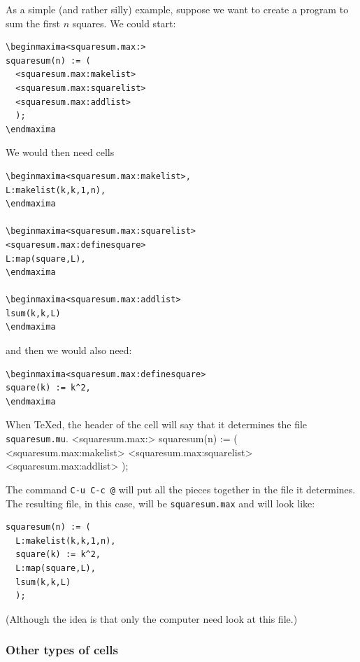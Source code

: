 As a simple (and rather silly) example, suppose we want to create a
program to sum the first $n$ squares.  We could start:
\begin{verbatim}
\beginmaxima<squaresum.max:>
squaresum(n) := (
  <squaresum.max:makelist>
  <squaresum.max:squarelist>
  <squaresum.max:addlist>
  );        
\endmaxima
\end{verbatim}
\noindent
We would then need cells
\begin{verbatim}
\beginmaxima<squaresum.max:makelist>,
L:makelist(k,k,1,n),
\endmaxima

\beginmaxima<squaresum.max:squarelist>
<squaresum.max:definesquare>
L:map(square,L),
\endmaxima

\beginmaxima<squaresum.max:addlist>
lsum(k,k,L)
\endmaxima
\end{verbatim}
\noindent
and then we would also need:
\begin{verbatim}
\beginmaxima<squaresum.max:definesquare>
square(k) := k^2,
\endmaxima
\end{verbatim}
\noindent
When \TeX{}ed, the header of the cell will say that it determines the
file \texttt{squaresum.mu}.  
\beginmaxima<squaresum.max:>
squaresum(n) := (
  <squaresum.max:makelist>
  <squaresum.max:squarelist>
  <squaresum.max:addlist>
  );        
\endmaxima

The command 
\texttt{C-u C-c @} will put all the pieces
together in the file it determines.  The resulting file, in this case,
will be \texttt{squaresum.max} and will look like:
\begin{verbatim}
squaresum(n) := (
  L:makelist(k,k,1,n),
  square(k) := k^2,
  L:map(square,L),
  lsum(k,k,L)
  );        
\end{verbatim}
\noindent
(Although the idea is that only the computer need look at this file.)

\subsubsection{Other types of cells}

